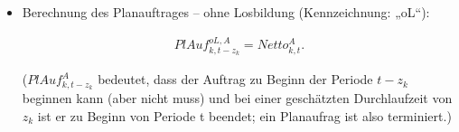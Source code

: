 \documentclass[13pt,a4paper, listof=entryprefix, bibliography=totocnumbered,toc=listofnumbered,lof=listofnumbered]{scrartcl}
\begin{document}
\begin{algorithmic}
\begin{itemize} [leftmargin=*]
\begin{enumerate} [leftmargin=1.5em, label=]
\begin{enumerate} [leftmargin=*, label= \arabic*.]
\begin{itemize} [leftmargin=*]
					                  \item Berechnung des Planauftrages -- ohne Losbildung (Kennzeichnung: „oL“):

					                        \begin{fleqn}
						                        \begin{align*}
							                        PlAuf^{oL,A}_{k,t - z_{k}} = Netto^{A}_{k,t}\text{.}
						                        \end{align*}
					                        \end{fleqn}
					                        ($PlAuf^{A}_{k,t - z_{k}}$ bedeutet, dass der Auftrag zu Beginn der Periode $t - z_{k}$ beginnen kann (aber nicht muss) und bei einer geschätzten Durchlaufzeit von $z_{k}$ ist er zu Beginn von Periode t beendet; ein Planaufrag ist also terminiert.)	\\

				                  \end{itemize}


\end{enumerate}
\end{enumerate}
\end{itemize}
\end{algorithmic}
\end{document}
